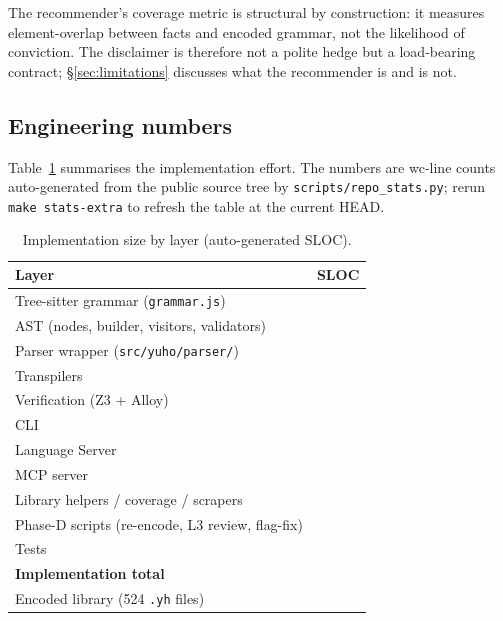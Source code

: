The recommender's coverage metric is structural by construction: it
measures element-overlap between facts and encoded grammar, not the
likelihood of conviction. The disclaimer is therefore not a polite
hedge but a load-bearing contract; \S\ref{sec:limitations} discusses
what the recommender is and is not.

\subsection{Engineering numbers}
Table~\ref{tab:sloc} summarises the implementation effort. The numbers
are wc-line counts auto-generated from the public source tree by
\texttt{scripts/repo\_stats.py}; rerun \texttt{make stats-extra} to
refresh the table at the current HEAD.

\begin{table}[t]
\caption{Implementation size by layer (auto-generated SLOC).}
\label{tab:sloc}
\begin{small}
\begin{tabular}{@{}lr@{}}
\toprule
\textbf{Layer} & \textbf{SLOC} \\ \midrule
Tree-sitter grammar (\texttt{grammar.js})           & \statTREESITTERGRAMMAR{} \\
AST (nodes, builder, visitors, validators)          & \statAST{} \\
Parser wrapper (\texttt{src/yuho/parser/})          & \statPARSERWRAPPER{} \\
Transpilers                                          & \statTRANSPILERS{} \\
Verification (Z3 + Alloy)                           & \statVERIFICATION{} \\
CLI                                                  & \statCLI{} \\
Language Server                                      & \statLANGUAGESERVER{} \\
MCP server                                           & \statMCPSERVER{} \\
Library helpers / coverage / scrapers               & \statLIBRARYHELPERS{} \\
Phase-D scripts (re-encode, L3 review, flag-fix)    & \statPHASEDSCRIPTS{} \\
Tests                                                & \statTESTS{} \\ \midrule
\textbf{Implementation total}                        & \textbf{\statTotalImplementation{}} \\ \midrule
Encoded library (524 \texttt{.yh} files)            & \statENCODEDLIBRARYYH{} \\
\bottomrule
\end{tabular}
\end{small}
\end{table}


